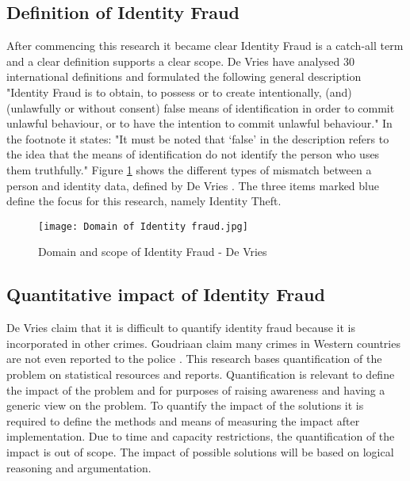 \subsection{Definition of Identity Fraud}\label{Def_ID_Fraud}
After commencing this research it became clear Identity Fraud is a catch-all term and a clear definition supports a clear scope. De Vries \etal \cite{97408536fd1c4f4e9d1615b7a4a4473e} have analysed 30 international definitions and formulated the following general description "Identity Fraud is to obtain, to possess or to create intentionally, (and) (unlawfully or without consent) false means of identification in order to commit unlawful behaviour, or to have the intention to commit unlawful behaviour." In the footnote it states: "It must be noted that ‘false’ in the description refers to the idea that the means of identification do not identify the person who uses them truthfully." 
Figure \ref{fig:ID_fraud} shows the different types of mismatch between a person and identity data, defined by De Vries \etal \cite{Vries2007IdentiteitsfraudeEA}. The three items marked blue define the focus for this research, namely Identity Theft.

    \begin{figure}
        \graphicspath{ {./images/} }
        \texttt{[image: Domain of Identity fraud.jpg]}\\
        \caption{Domain and scope of Identity Fraud - De Vries \etal \cite{Vries2007IdentiteitsfraudeEA}}
        \label{fig:ID_fraud}
    \end{figure}

\subsection{Quantitative impact of Identity Fraud}\label{QI}
De Vries \etal claim that it is difficult to quantify identity fraud because it is incorporated in other crimes\cite{Vries2007IdentiteitsfraudeEA}. Goudriaan \etal claim many crimes in Western countries are not even reported to the police \cite{Gourdriaan_etal}. This research bases quantification of the problem on statistical resources and reports. Quantification is relevant to define the impact of the problem and for purposes of raising awareness and having a generic view on the problem. To quantify the impact of the solutions it is required to define the methods and means of measuring the impact after implementation. Due to time and capacity restrictions, the quantification of the impact is out of scope. The impact of possible solutions will be based on logical reasoning and argumentation.

